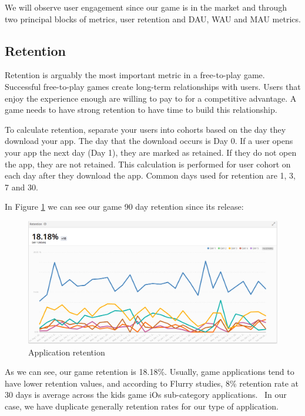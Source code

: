 We will observe user engagement since our game is in the market and through two principal blocks of metrics, user retention and DAU, WAU and MAU metrics.

\subsection{Retention}
Retention is arguably the most important metric in a free-to-play game. Successful free-to-play games create long-term relationships with users. Users that enjoy the experience enough are willing to pay to for a competitive advantage. A game needs to have strong retention to have time to build this relationship.

To calculate retention, separate your users into cohorts based on the day they download your app. The day that the download occurs is Day 0. If a user opens your app the next day (Day 1), they are marked as retained. If they do not open the app, they are not retained. This calculation is performed for user cohort on each day after they download the app. Common days used for retention are 1, 3, 7 and 30.~\cite{gametrics2}

In Figure \ref{fig:app-retention} we can see our game 90 day retention since its release:

\begin{figure}[h]
\centering
\includegraphics[width=350pt]{graphics/evaluation/app_retention.png}
\caption{Application retention}
\label{fig:app-retention}
\end{figure}

\FloatBarrier

As we can see, our game retention is 18.18\%. Usually, game applications tend to have lower retention values, and  according to Flurry studies, 8\% retention rate at 30 days is average across the kids game iOs sub-category applications.~\cite{flurry2} In our case, we have duplicate generally retention rates for our type of application.


